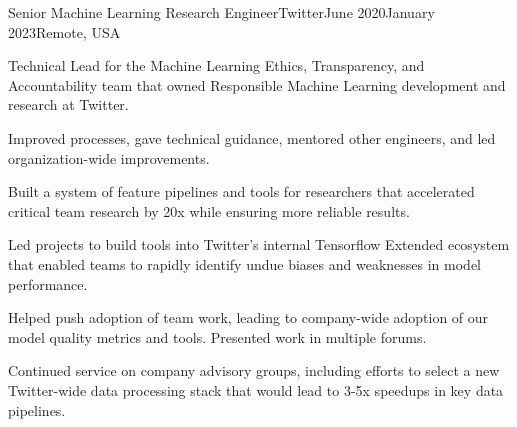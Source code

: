 \documentclass[print]{friggeri-cv} %
\begin{document}
\begin{job}
  {}{Senior Machine Learning Research Engineer}{Twitter}{June 2020}{January 2023}{Remote, USA}{
    Technical Lead for the Machine Learning Ethics, Transparency, and Accountability team that owned
    Responsible Machine Learning development and research at Twitter.
    

    \begin{myitemize}

      \item Improved processes, gave technical guidance, mentored other engineers, and led
      organization-wide improvements.

      \item Built a system of feature pipelines and tools for researchers that accelerated critical team
      research by 20x while ensuring more reliable results.

      \item Led projects to build tools into Twitter's internal Tensorflow Extended ecosystem that enabled teams to
      rapidly identify undue biases and weaknesses in model performance.

      \item Helped push adoption of team work, leading to company-wide adoption of our model quality metrics and tools. Presented work in multiple forums.
      \autocite{twitter_htl_racial_bias,twitter_recsys_distributional_inequality,facct_2022_talk,datascience_2022_talk,privacy_enchancing_tech_post}

      \item Continued service on company advisory groups, including efforts to select a new Twitter-wide data processing stack that would 
      lead to 3-5x speedups in key data pipelines.

    \end{myitemize}
  }
\end{job}
\end{document}
